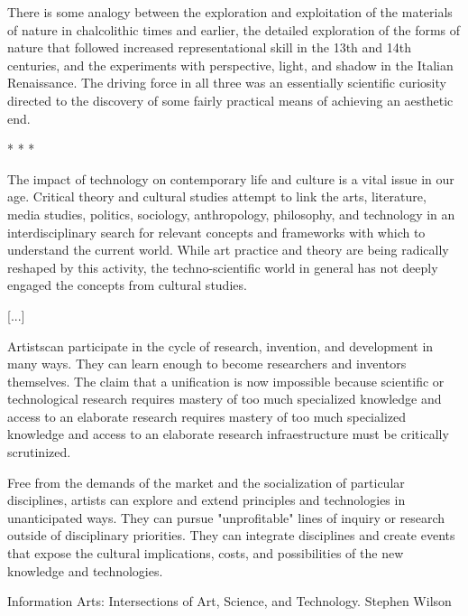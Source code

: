 

There is some analogy between the exploration and exploitation of the materials of nature in chalcolithic times and earlier, the detailed exploration of the forms of nature that followed increased representational skill in the 13th and 14th centuries, and the experiments with perspective, light, and shadow in the Italian Renaissance. The driving force in all three was an essentially scientific curiosity directed to the discovery of some fairly practical means of achieving an aesthetic end.


* * *

The impact of technology on contemporary life and culture is a vital issue in our age. Critical theory and cultural studies attempt to link the arts, literature, media studies, politics, sociology, anthropology, philosophy, and technology in an interdisciplinary search for relevant concepts and frameworks with which to understand the current world. While art practice and theory are being radically reshaped by this activity, the techno-scientific world in general has not deeply engaged the concepts from cultural studies. 

[...]

Artistscan participate in the cycle of research, invention, and development in many ways. They can learn enough to become researchers and inventors themselves. The claim that a unification is now impossible because scientific or technological research requires mastery of too much specialized knowledge and access to an elaborate research requires mastery of too much specialized knowledge and access to an elaborate research infraestructure must be critically scrutinized.

Free from the demands of the market and the socialization of particular disciplines, artists can explore and extend principles and technologies in unanticipated ways. They can pursue "unprofitable" lines of inquiry or research outside of disciplinary priorities. They can integrate disciplines and create events that expose the cultural implications, costs, and possibilities of the new knowledge and technologies.

Information Arts: Intersections of Art, Science, and Technology.
Stephen Wilson

